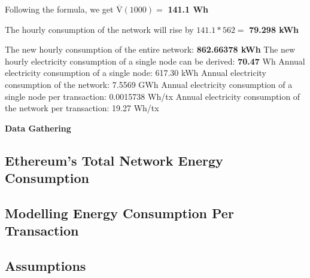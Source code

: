 Following the formula, we get $\boldsymbol{\mathrm{\overline{V}(\mathrm{1000})}} =$ \textbf{141.1 Wh}

The hourly consumption of the network will rise by $141.1 * 562 = $ \textbf{79.298 kWh}

The new hourly consumption of the entire network: \textbf{862.66378 kWh} 
The new hourly electricity consumption of a single node can be derived: \textbf{70.47} Wh
Annual electricity consumption of a single node: 617.30 kWh 
Annual electricity consumption of the network: 7.5569 GWh
Annual electricity consumption of a single node per transaction: 0.0015738 Wh/tx
Annual electricity consumption of the network per transaction: 19.27 Wh/tx



\checkmark


\textbf{Data Gathering}

\subsection{Ethereum's Total Network Energy Consumption}

\subsection {Modelling Energy Consumption Per Transaction}

\subsection{Assumptions}

